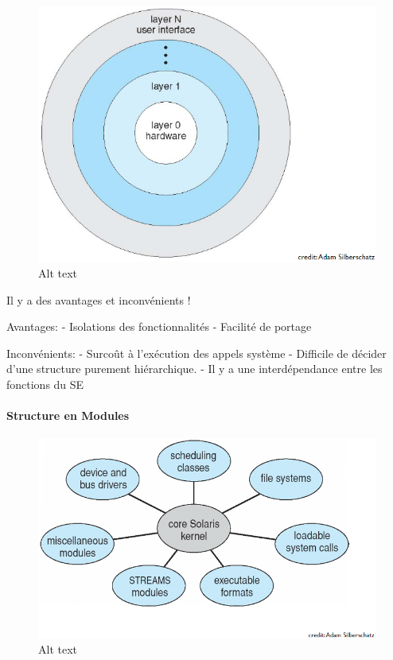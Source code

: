\begin{figure}
\centering
\includegraphics{image-19.png}
\caption{Alt text}
\end{figure}

Il y a des avantages et inconvénients !

Avantages: - Isolations des fonctionnalités - Facilité de portage

Inconvénients: - Surcoût à l'exécution des appels système - Difficile de
décider d'une structure purement hiérarchique. - Il y a une
interdépendance entre les fonctions du SE

\paragraph{Structure en Modules}\label{structure-en-modules}

\begin{figure}
\centering
\includegraphics{image-20.png}
\caption{Alt text}
\end{figure}

